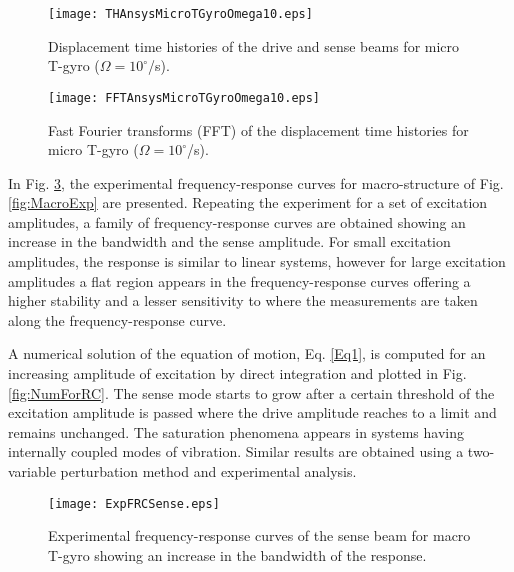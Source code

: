 \documentclass[twoside]{article}
\begin{document}
\begin{figure}[!h!] %
	\begin{center}
		\texttt{[image: THAnsysMicroTGyroOmega10.eps]}
		\caption{Displacement time histories of the drive and sense beams for micro T-gyro ($\Omega = 10^{\circ}$/s).}
		\label{fig:THAnsysMicroTGyroOmega10}
	\end{center}
\end{figure}

\begin{figure}[!h!] %
	\begin{center}
		\texttt{[image: FFTAnsysMicroTGyroOmega10.eps]}
		\caption{Fast Fourier transforms (FFT) of the displacement time histories for micro T-gyro ($\Omega = 10^{\circ}$/s).}
		\label{fig:FFTAnsysMicroTGyroOmega10}
	\end{center}
\end{figure}
%

In Fig. \ref{fig:ExpFRCSense}, the experimental frequency-response curves for macro-structure of Fig. \ref{fig:MacroExp} are presented. Repeating the experiment for a set of excitation amplitudes, a family of frequency-response curves are obtained showing an increase in the bandwidth and the sense amplitude. For small excitation amplitudes, the response is similar to linear systems, however for large excitation amplitudes a flat region appears in the frequency-response curves offering a higher stability and a lesser sensitivity to where the measurements are taken along the frequency-response curve. 

A numerical solution of the equation of motion, Eq. \ref{Eq1}, is computed for an increasing amplitude of excitation by direct integration and plotted in Fig. \ref{fig:NumForRC}. The sense mode starts to grow after a certain threshold of the excitation amplitude is passed where the drive amplitude reaches to a limit and remains unchanged. The saturation phenomena appears in systems having internally coupled modes of vibration. Similar results are obtained using a two-variable perturbation method and experimental analysis. 

\begin{figure}[!h!] %
	\begin{center}
		\texttt{[image: ExpFRCSense.eps]}
		\caption{Experimental frequency-response curves of the sense beam for macro T-gyro showing an increase in the bandwidth of the response.}
		\label{fig:ExpFRCSense}
	\end{center}
\end{figure}
\end{document}
